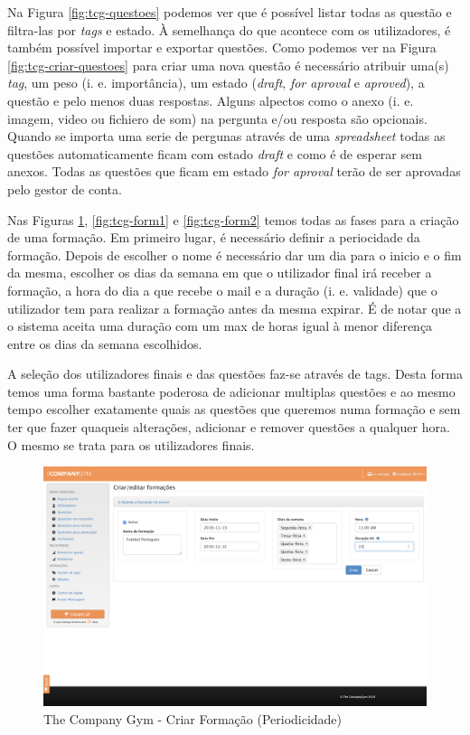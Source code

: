 Na Figura \ref{fig:tcg-questoes} podemos ver que é possível listar todas as questão e filtra-las por \textit{tags} e estado. À semelhança do que acontece com os utilizadores, é também possível importar e exportar questões. Como podemos ver na Figura \ref{fig:tcg-criar-questoes} para criar uma nova questão é necessário atribuir uma(s) \textit{tag}, um peso (i. e. importância), um estado (\textit{draft}, \textit{for aproval} e \textit{aproved}), a questão e pelo menos duas respostas. Alguns alpectos como o anexo (i. e. imagem, video ou fichiero de som) na pergunta e/ou resposta são opcionais. Quando se importa uma serie de pergunas através de uma \textit{spreadsheet} todas as questões automaticamente ficam com estado \textit{draft} e como é de esperar sem anexos. Todas as questões que ficam em estado \textit{for aproval} terão de ser aprovadas pelo gestor de conta.


Nas Figuras \ref{fig:tcg-form}, \ref{fig:tcg-form1} e \ref{fig:tcg-form2} temos todas as fases para a criação de uma formação. Em primeiro lugar, é necessário definir a periocidade da formação.  Depois de escolher o nome é necessário dar um dia para o inicio e o fim da mesma, escolher os dias da semana em que o utilizador final irá receber a formação, a hora do dia a que recebe o mail e a duração (i. e. validade) que o utilizador tem para realizar a formação antes da mesma expirar. É de notar que a o sistema aceita uma duração com um max de horas igual à menor diferença entre os dias da semana escolhidos.

 A seleção dos utilizadores finais e das questões faz-se através de tags. Desta forma temos uma forma bastante poderosa de adicionar multiplas questões e ao mesmo tempo escolher exatamente quais as questões que queremos numa formação e sem ter que fazer quaqueis alterações, adicionar e remover questões a qualquer hora. O mesmo se trata para os utilizadores finais. 
 


\begin{figure}[ht!]
	\begin{center}
		\includegraphics[width=1\textwidth]{img/tcg/tcg-form.png}
		\caption{The Company Gym - Criar Formação (Periodicidade)}
		\label{fig:tcg-form}
	\end{center}
\end{figure}
 
